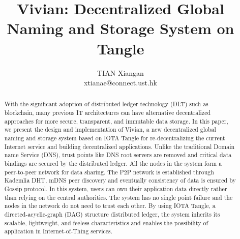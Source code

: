 \documentclass[conference, 10pt]{ieeetran}
\begin{document}
\title{Vivian: Decentralized Global Naming and Storage System on Tangle}

\author{TIAN Xiangan \\ xtianae@connect.ust.hk}

\maketitle

\begin{abstract}

With the significant adoption of distributed ledger technology (DLT) such as blockchain, many previous IT architectures can have alternative decentralized approaches for more secure, transparent, and immutable data storage.
In this paper, we present the design and implementation of Vivian, a new decentralized global naming and storage system based on IOTA Tangle for re-decentralizing the current Internet service and building decentralized applications.
Unlike the traditional Domain name Service (DNS), trust points like DNS root servers are removed and critical data bindings are secured by the distributed ledger. All the nodes in the system form a peer-to-peer network for data sharing.
The P2P network is established through Kademlia DHT, mDNS peer discovery and eventually consistency of data is ensured by Gossip protocol.
In this system, users can own their application data directly rather than relying on the central authorities. The system has no single point failure and the nodes in the network do not need to trust each other.
By using IOTA Tangle, a directed-acyclic-graph (DAG) structure distributed ledger, the system inherits its scalable, lightweight, and feeless characteristics and enables the possibility of application in Internet-of-Thing services.

\end{abstract}


\end{document}
